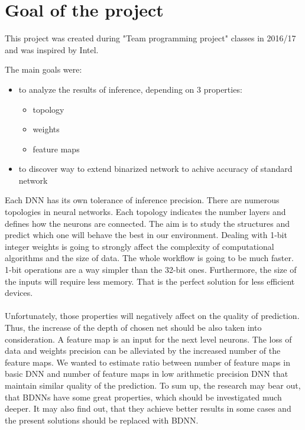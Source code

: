 \documentclass[licencjacka]{pracamgr}
\newcommand{\krystynaintodo}[1]{\todo[inline,color=red!40,bordercolor=red,size=\footnotesize]{\textbf{TODO:}#1}}
\begin{document}
	\krystynaintodo{wkleić tabelkę z pracy XORNET}


	\section{Goal of the project}
	
	This project was created during "Team programming project" classes in 2016/17 and was inspired by Intel.

	The main goals were:  
	\begin{itemize}
		\item to analyze the results of inference, depending on 3 properties:
		\begin{itemize}
			\item topology
			\item weights
			\item feature maps
		\end{itemize}
		\item to discover way to extend binarized network to achive accuracy of standard network
	\end{itemize}


	Each DNN has its own tolerance of inference precision. There are numerous topologies in neural networks. Each topology indicates the number layers and defines how the neurons are connected. The aim is to study the structures and predict which one will behave the best in our environment. Dealing with 1-bit integer weights is going to strongly affect the complexity of computational algorithms and the size of data. The whole workflow is going to be much faster. 1-bit operations are a way simpler than the 32-bit ones. Furthermore, the size of the inputs will require less memory. That is the perfect solution for less efficient devices. 
	\\\\
	Unfortunately, those properties will negatively affect on the quality of prediction. Thus, the increase of the depth of chosen net should be also taken into consideration. A feature map is an input for the next level neurons.  The loss of data and weights precision can be alleviated by the increased number of the feature maps. We wanted to estimate ratio between number of feature maps in basic DNN and number of feature maps in low arithmetic precision DNN that maintain similar quality of the prediction.
	 To sum up, the research may bear out, that BDNNs have some great properties, which should be investigated much deeper. It may also find out, that they achieve better results in some cases and the present solutions should be replaced with BDNN.
\end{document}
